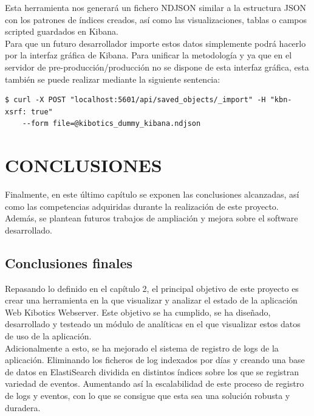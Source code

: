 \documentclass[11pt,a4paper]{book}
\begin{document}
			Esta herramienta nos generará un fichero NDJSON similar a la estructura JSON con los patrones de índices creados, así como las visualizaciones, tablas o campos scripted guardados en Kibana.\\
			
			Para que un futuro desarrollador importe estos datos simplemente podrá hacerlo por la interfaz gráfica de Kibana. Para unificar la metodología y ya que en el servidor de pre-producción/producción no se dispone de esta interfaz gráfica, esta también se puede realizar mediante la siguiente sentencia:\\
			

			
			\begin{Verbatim}[tabsize=4]
$ curl -X POST "localhost:5601/api/saved_objects/_import" -H "kbn-xsrf: true" 
	--form file=@kibotics_dummy_kibana.ndjson
			\end{Verbatim}
			
			


	\chapter{CONCLUSIONES}
		Finalmente, en este último capítulo se exponen las conclusiones alcanzadas, así como las competencias adquiridas durante la realización de este proyecto. Además, se plantean futuros trabajos de ampliación y mejora sobre el software desarrollado.
		\section{Conclusiones finales}
			Repasando lo definido en el capítulo 2, el principal objetivo de este proyecto es crear una herramienta en la que visualizar y analizar el estado de la aplicación Web Kibotics Webserver. Este objetivo se ha cumplido, se ha diseñado, desarrollado y testeado un módulo de analíticas en el que visualizar estos datos de uso de la aplicación.\\
			
			Adicionalmente a esto, se ha mejorado el sistema de registro de logs de la aplicación. Eliminando los ficheros de log indexados por días y creando una base de datos en ElastiSearch dividida en distintos índices sobre los que se registran variedad de eventos. Aumentando así la escalabilidad de este proceso de registro de logs y eventos, con lo que se consigue que esta sea una solución robusta y duradera.
\end{document}

